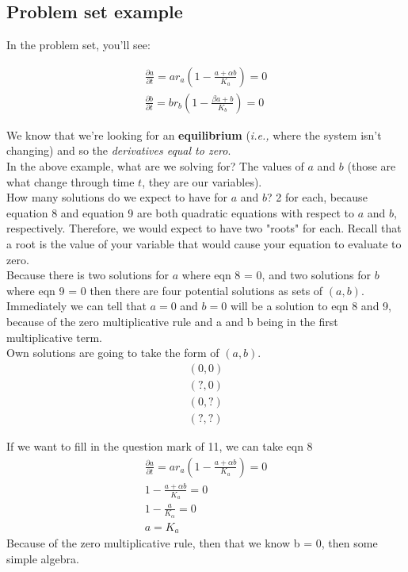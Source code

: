 \documentclass{article}
\begin{document}
\subsection{Problem set example}

In the problem set, you'll see:

\begin{align}
    \frac{\partial a}{\partial t} = ar_a (1 - \frac{a + \alpha b}{K_a}) = 0\\
    \frac{\partial b}{\partial t} = br_b (1 - \frac{\beta a + b }{K_b}) = 0
\end{align}

We know that we're looking for an \textbf{equilibrium} (\textit{i.e., } where the system isn't changing) and so the \textit{derivatives  equal to zero}. \\

In the above example, what are we solving for? The values of $a$ and $b$ (those are what change through time $t$, they are our variables). \\

How many solutions do we expect to have for $a$ and $b$? 2 for each, because equation 8 and equation 9 are both quadratic equations with respect to $a$ and $b$, respectively. Therefore, we would expect to have two "roots" for each. Recall that a root is the value of your variable that would cause your equation to evaluate to zero. \\

Because there is two solutions for $a$ where eqn 8 = 0, and two solutions for $b$ where eqn 9 = 0 then there are four potential solutions as sets of $(a,b)$. Immediately we can tell that $a= 0$ and $b = 0$ will be a solution to eqn 8 and 9, because of the zero multiplicative rule and a and b being in the first multiplicative term. \\

Own solutions are going to take the form of $(a, b)$. 
\begin{align}
    (0, 0) \\
    (?, 0) \\
    (0, ?) \\
    (?, ?)
\end{align}

If we want to fill in the question mark of 11, we can take eqn 8 
\begin{align*}
    \frac{\partial a}{\partial t} = ar_a (1 - \frac{a + \alpha b}{K_a}) = 0 \\
    1 - \frac{a + \alpha b}{K_a} = 0 \\ 
    1 - \frac{a}{K_\alpha} = 0\\
    a = K_a
\end{align*}
Because of the zero multiplicative rule, then that we know b = 0,  then some simple algebra. 
\end{document}
